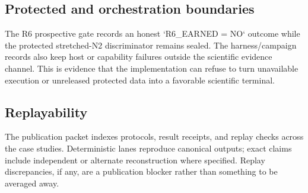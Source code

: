 \subsection{Protected and orchestration boundaries}
The R6 prospective gate records an honest `R6_EARNED = NO` outcome while the protected stretched-N2 discriminator remains sealed. The harness/campaign records also keep host or capability failures outside the scientific evidence channel. This is evidence that the implementation can refuse to turn unavailable execution or unreleased protected data into a favorable scientific terminal.

\subsection{Replayability}
The publication packet indexes protocols, result receipts, and replay checks across the case studies. Deterministic lanes reproduce canonical outputs; exact claims include independent or alternate reconstruction where specified. Replay discrepancies, if any, are a publication blocker rather than something to be averaged away.